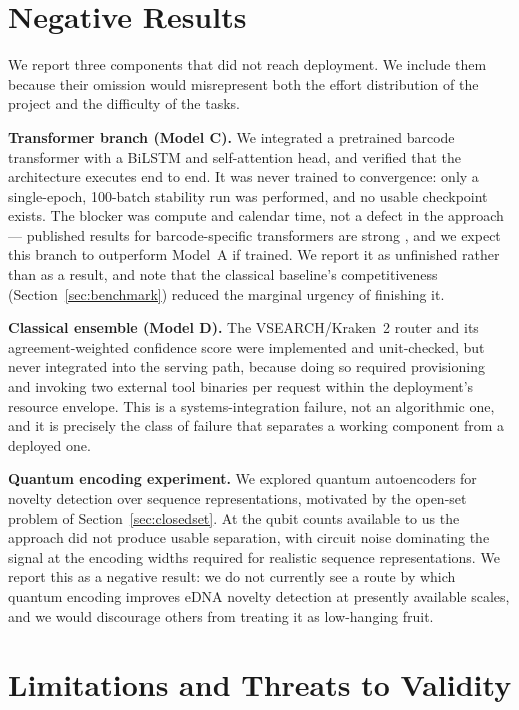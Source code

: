 \documentclass[conference]{IEEEtran}
\begin{document}
\section{Negative Results}
\label{sec:negative}

We report three components that did not reach deployment. We include them
because their omission would misrepresent both the effort distribution of
the project and the difficulty of the tasks.

\textbf{Transformer branch (Model C).} We integrated a pretrained barcode
transformer \cite{barcodebert} with a BiLSTM and self-attention head, and
verified that the architecture executes end to end. It was never trained to
convergence: only a single-epoch, 100-batch stability run was performed, and
no usable checkpoint exists. The blocker was compute and calendar time, not
a defect in the approach --- published results for barcode-specific
transformers are strong \cite{barcodebert}, and we expect this branch to
outperform Model~A if trained. We report it as unfinished rather than as a
result, and note that the classical baseline's competitiveness
(Section~\ref{sec:benchmark}) reduced the marginal urgency of finishing it.

\textbf{Classical ensemble (Model D).} The VSEARCH/Kraken~2 router and its
agreement-weighted confidence score were implemented and unit-checked, but
never integrated into the serving path, because doing so required
provisioning and invoking two external tool binaries per request within the
deployment's resource envelope. This is a systems-integration failure, not
an algorithmic one, and it is precisely the class of failure that separates
a working component from a deployed one.

\textbf{Quantum encoding experiment.} We explored quantum autoencoders for
novelty detection over sequence representations, motivated by the open-set
problem of Section~\ref{sec:closedset}. At the qubit counts available to us
the approach did not produce usable separation, with circuit noise dominating
the signal at the encoding widths required for realistic sequence
representations. We report this as a negative result: we do not currently
see a route by which quantum encoding improves eDNA novelty detection at
presently available scales, and we would discourage others from treating it
as low-hanging fruit.

\section{Limitations and Threats to Validity}
\label{sec:threats}
\end{document}
